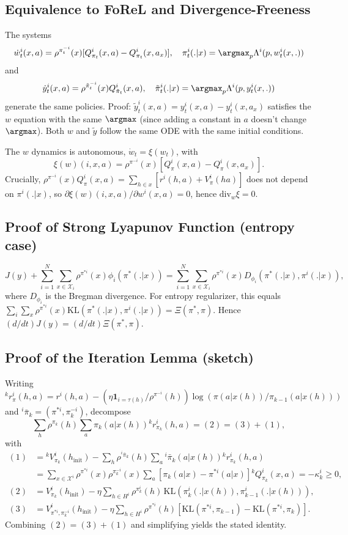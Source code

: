 \subsection{Equivalence to FoReL and Divergence-Freeness}
The systems
$$\dot w_t^i(x, a) = \rho^{\pi_t^{-i}}(x)[Q^i_{\pi_t}(x, a) - Q^i_{\pi_t}(x, a_x)],\quad \pi^i_t(.|x)=\argmax_p \Lambda^i(p, w_t^i(x,.))$$
and
$$\dot y_t^i(x, a) = \rho^{\tilde \pi_t^{-i}}(x) Q^i_{\tilde \pi_t}(x, a),\quad \tilde\pi^i_t(.|x)=\argmax_p \Lambda^i(p, y_t^i(x,.))$$
generate the same policies. Proof: $\tilde y_t^i(x,a) = y_t^i(x,a) - y_t^i(x,a_x)$ satisfies the $w$ equation with the same $\argmax$ (since adding a constant in $a$ doesn't change $\argmax$). Both $w$ and $\tilde y$ follow the same ODE with the same initial conditions.

The $w$ dynamics is autonomous, $\dot w_t = \xi(w_t)$, with
$$\xi(w)(i,x,a) = \rho^{\pi^{-i}}(x)[Q^i_{\pi}(x,a)-Q^i_{\pi}(x,a_x)].$$
Crucially, $\rho^{\pi^{-i}}(x) Q^i_{\pi}(x, a) = \sum_{h \in x}[r^i(h,a) + V^i_\pi(ha)]$ does not depend on $\pi^i(.|x)$, so $\partial \xi(w)(i,x,a) / \partial w^i(x,a) = 0$, hence $\mathrm{div}_w \xi = 0$.

\subsection{Proof of Strong Lyapunov Function (entropy case)}
$$J(y) + \sum_{i=1}^N \sum_{x \in \mathcal{X}_i} \rho^{\pi^{*i}}(x)\phi_i(\pi^*(.|x)) = \sum_{i=1}^N \sum_{x \in \mathcal{X}_i} \rho^{\pi^{*i}}(x) D_{\phi_i}(\pi^*(.|x), \pi^i(.|x)),$$
where $D_{\phi_i}$ is the Bregman divergence. For entropy regularizer, this equals $\sum_i \sum_x \rho^{\pi^{*i}}(x) \textrm{KL}(\pi^*(.|x), \pi^i(.|x)) = \Xi(\pi^*,\pi)$. Hence $(d/dt)J(y) = (d/dt)\Xi(\pi^*,\pi)$.

\subsection{Proof of the Iteration Lemma (sketch)}
Writing ${}^k r^i_\pi(h, a) = r^i(h, a) - (\eta\mathbf{1}_{i=\tau(h)}/\rho^{\pi^{-i}}(h)) \log(\pi(a|x(h))/\pi_{k-1}(a|x(h)))$ and ${}^i\bar\pi_k=(\pi^{*i}, \pi_k^{-i})$, decompose
$$\sum_h \rho^{\pi_k}(h) \sum_a \pi_k(a|x(h)){}^k r^i_{\pi_k}(h,a) = (2) = (3) + (1),$$
with
\begin{align*}
(1) &= {}^k V^i_{\pi_k}(h_{\textrm{init}}) - \sum_h \rho^{{}^i\bar\pi_k}(h)\sum_a {}^i\bar\pi_k(a|x(h)){}^k r^i_{\pi_k}(h,a)\\
&= \sum_{x\in\mathcal{X}^i}\rho^{\pi^{*i}}(x)\rho^{\pi_k^{-i}}(x)\sum_a\left[\pi_k(a|x)-\pi^{*i}(a|x)\right]{}^k Q^i_{\pi_k}(x,a) = -\kappa^i_k \geq 0,\\
(2) &= V^i_{\pi_k}(h_{\textrm{init}}) - \eta\sum_{h\in H^i}\rho^{\pi^i_k}(h)\,\textrm{KL}(\pi^i_k(.|x(h)), \pi^i_{k-1}(.|x(h))),\\
(3) &= V^i_{\pi^{*i}, \pi^{-i}_k}(h_{\textrm{init}}) - \eta\sum_{h\in H^i}\rho^{\pi^{*i}}(h)\left[\textrm{KL}(\pi^{*i}, \pi_{k-1}) - \textrm{KL}(\pi^{*i}, \pi_k)\right].
\end{align*}
Combining $(2)=(3)+(1)$ and simplifying yields the stated identity.

